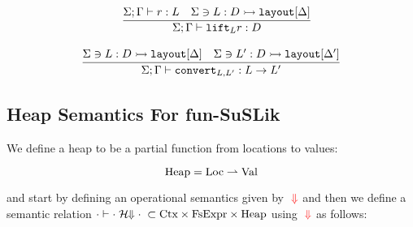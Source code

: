 \documentclass[10pt]{article}
\begin{document}
\[\begin{array}{c}
    ~~~
    \infer{\Sigma ; \Gamma \vdash \liftS{L} r : D}{\Sigma ; \Gamma \vdash r : L & \Sigma \ni L : D \hra \ttt{layout}[\Delta]}
    \\\\
    \infer{\Sigma ; \Gamma \vdash \ttt{convert}_{L,L'} : L \ra L'}
          {\Sigma \ni L : D \hra \ttt{layout}[\Delta] & \Sigma \ni L' : D \hra \ttt{layout}[\Delta']}
  \end{array}
\]




%

\subsection{Heap Semantics For fun-SuSLik}

We define a heap to be a partial function from locations to values:

\begin{equation*}
  \textnormal{Heap} = \textnormal{Loc} \rightharpoonup \textnormal{Val}
\end{equation*}

\noindent
and start by defining an operational semantics given by ${\color{red}\;{\Downarrow}}$ and then we
define a semantic relation $\cdot \vdash \cdot \;\mathcal{H}\!\!\Downarrow \cdot\; \subset \textnormal{Ctx} \times \textnormal{FsExpr} \times \textnormal{Heap}$ using ${\color{red}\;{\Downarrow}}$ as follows:
\end{document}
